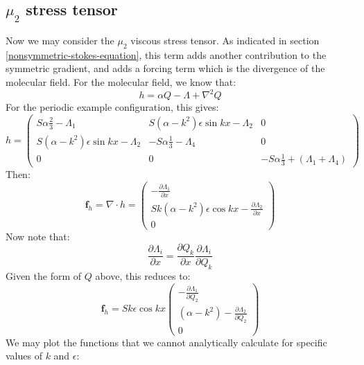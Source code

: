 \documentclass[reqno]{article}
\begin{document}
\subsection{$\mu_2$ stress tensor}
Now we may consider the $\mu_2$ viscous stress tensor.
As indicated in section \ref{nonsymmetric-stokes-equation}, this term adds
another contribution to the symmetric gradient, and adds a forcing term which is
the divergence of the molecular field.
For the molecular field, we know that:
\begin{equation}
  h
  =
  \alpha Q
  - \Lambda
  + \nabla^2 Q
\end{equation}
For the periodic example configuration, this gives:
\begin{equation}
  h
  =
  \begin{pmatrix}
    S\alpha \tfrac23 - \Lambda_1 & S\left( \alpha - k^2\right) \epsilon \sin kx - \Lambda_2 & 0 \\
    S \left( \alpha - k^2\right) \epsilon \sin kx - \Lambda_2 & -S \alpha \tfrac13 - \Lambda_4 & 0 \\
    0 & 0 & -S\alpha \tfrac13 + (\Lambda_1 + \Lambda_4)
  \end{pmatrix}
\end{equation}
Then:
\begin{equation}
  \mathbf{f}_h
  =
  \nabla \cdot h
  =
  \begin{pmatrix}
    -\frac{\partial \Lambda_1}{\partial x} \\
    Sk \left( \alpha - k^2 \right) \epsilon \cos kx - \frac{\partial \Lambda_2}{\partial x} \\
    0
  \end{pmatrix}
\end{equation}
Now note that:
\begin{equation}
  \frac{\partial \Lambda_i}{\partial x}
  =
  \frac{\partial Q_k}{\partial x} \frac{\partial \Lambda_i}{\partial Q_k}
\end{equation}
Given the form of $Q$ above, this reduces to:
\begin{equation}
  \mathbf{f}_h
  =
  S k \epsilon \cos kx
  \begin{pmatrix}
    -\frac{\partial \Lambda_1}{\partial Q_2} \\
    (\alpha - k^2) - \frac{\partial \Lambda_2}{\partial Q_2} \\
    0
  \end{pmatrix}
\end{equation}
We may plot the functions that we cannot analytically calculate for specific
values of $k$ and $\epsilon$:
\end{document}
